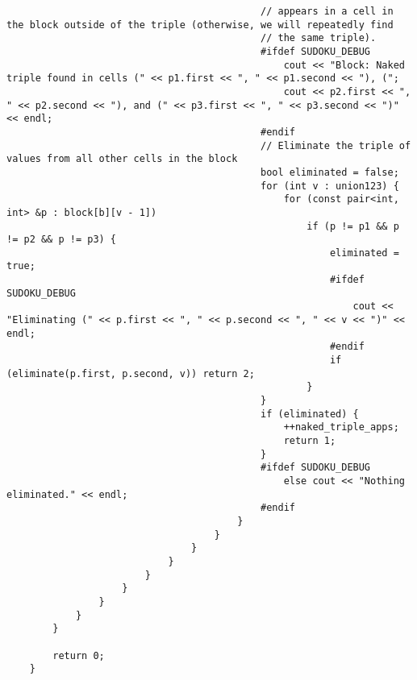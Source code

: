\documentclass{article}
\begin{document}
\begin{lstlisting}
                                            // appears in a cell in the block outside of the triple (otherwise, we will repeatedly find
                                            // the same triple).
                                            #ifdef SUDOKU_DEBUG
                                                cout << "Block: Naked triple found in cells (" << p1.first << ", " << p1.second << "), (";
                                                cout << p2.first << ", " << p2.second << "), and (" << p3.first << ", " << p3.second << ")" << endl;
                                            #endif
                                            // Eliminate the triple of values from all other cells in the block
                                            bool eliminated = false;
                                            for (int v : union123) {
                                                for (const pair<int, int> &p : block[b][v - 1])
                                                    if (p != p1 && p != p2 && p != p3) {
                                                        eliminated = true;
                                                        #ifdef SUDOKU_DEBUG
                                                            cout << "Eliminating (" << p.first << ", " << p.second << ", " << v << ")" << endl;
                                                        #endif
                                                        if (eliminate(p.first, p.second, v)) return 2;
                                                    }
                                            }
                                            if (eliminated) {
                                                ++naked_triple_apps;
                                                return 1;
                                            }
                                            #ifdef SUDOKU_DEBUG
                                                else cout << "Nothing eliminated." << endl;
                                            #endif
                                        }
                                    }
                                }
                            }
                        }
                    }
                }
            }
        }

        return 0;
    }


\end{lstlisting}
\end{document}
